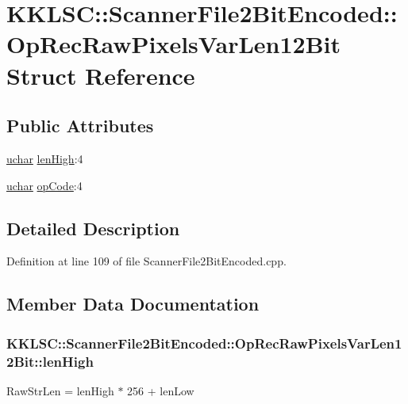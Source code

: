 \hypertarget{struct_scanner_file2_bit_encoded_1_1_op_rec_raw_pixels_var_len12_bit}{}\section{K\+K\+L\+SC\+:\+:Scanner\+File2\+Bit\+Encoded\+:\+:Op\+Rec\+Raw\+Pixels\+Var\+Len12\+Bit Struct Reference}
\label{struct_scanner_file2_bit_encoded_1_1_op_rec_raw_pixels_var_len12_bit}
\subsection*{Public Attributes}
\begin{DoxyCompactItemize}
\item 
\hyperlink{namespace_k_k_b_ace9969169bf514f9ee6185186949cdf7}{uchar} \hyperlink{struct_scanner_file2_bit_encoded_1_1_op_rec_raw_pixels_var_len12_bit_ab3474bbf5019e76f56b25a4856629ed0}{len\+High}\+:4
\item 
\hyperlink{namespace_k_k_b_ace9969169bf514f9ee6185186949cdf7}{uchar} \hyperlink{struct_scanner_file2_bit_encoded_1_1_op_rec_raw_pixels_var_len12_bit_ab2adc924cdf5a5db82edb8bdce14a350}{op\+Code}\+:4
\end{DoxyCompactItemize}


\subsection{Detailed Description}


Definition at line 109 of file Scanner\+File2\+Bit\+Encoded.\+cpp.



\subsection{Member Data Documentation}
\subsubsection[{\texorpdfstring{len\+High}{lenHigh}}]{ K\+K\+L\+S\+C\+::\+Scanner\+File2\+Bit\+Encoded\+::\+Op\+Rec\+Raw\+Pixels\+Var\+Len12\+Bit\+::len\+High}\hypertarget{struct_scanner_file2_bit_encoded_1_1_op_rec_raw_pixels_var_len12_bit_ab3474bbf5019e76f56b25a4856629ed0}{}\label{struct_scanner_file2_bit_encoded_1_1_op_rec_raw_pixels_var_len12_bit_ab3474bbf5019e76f56b25a4856629ed0}
Raw\+Str\+Len = len\+High $\ast$ 256 + len\+Low 

